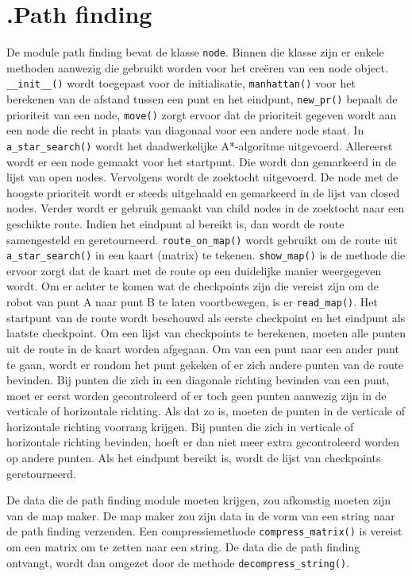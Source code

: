 \documentclass[a4paper,10pt]{article}
\begin{document}
\section*{\label{pathfinding}\thesection.\quad Path finding}
De module path finding bevat de klasse \verb!node!. Binnen die klasse zijn er enkele methoden aanwezig die gebruikt worden voor het cre\"{e}ren van een node object. \verb!__init__()! wordt toegepast voor de initialisatie, \verb!manhattan()! voor het berekenen van de afstand tussen een punt en het eindpunt, \verb!new_pr()! bepaalt de prioriteit van een node, \verb!move()! zorgt ervoor dat de prioriteit gegeven wordt aan een node die recht in plaats van diagonaal voor een andere node staat. In \verb!a_star_search()! wordt het daadwerkelijke A*-algoritme uitgevoerd. Allereerst wordt er een node gemaakt voor het startpunt. Die wordt dan gemarkeerd in de lijst van open nodes. Vervolgens wordt de zoektocht uitgevoerd. De node met de hoogste prioriteit wordt er steeds uitgehaald en gemarkeerd in de lijst van closed nodes. 
Verder wordt er gebruik gemaakt van child nodes in de zoektocht naar een geschikte route. Indien het eindpunt al bereikt is, dan wordt de route samengesteld en geretourneerd. \verb!route_on_map()! wordt gebruikt om de route uit \verb!a_star_search()! in een kaart (matrix) te tekenen. \verb!show_map()! is de methode die ervoor zorgt dat de kaart met de route op een duidelijke manier weergegeven wordt.
Om er achter te komen wat de checkpoints zijn die vereist zijn om de robot van punt A naar punt B te laten voortbewegen, is er \verb!read_map()!. Het startpunt van de route wordt beschouwd als eerste checkpoint en het eindpunt als laatste checkpoint. Om een lijst van checkpoints te berekenen, moeten alle punten uit de route in de kaart worden afgegaan. Om van een punt naar een ander punt te gaan, wordt er rondom het punt gekeken of er zich andere punten van de route bevinden. Bij punten die zich in een diagonale richting bevinden van een punt, moet er eerst worden gecontroleerd of er toch geen punten aanwezig zijn in de verticale of horizontale richting. Als dat zo is, moeten de punten in de verticale of horizontale richting voorrang krijgen. Bij punten die zich in verticale of horizontale richting bevinden, hoeft er dan niet meer extra gecontroleerd worden op andere punten. Als het eindpunt bereikt is, wordt de lijst van checkpoints geretourneerd.

De data die de path finding module moeten krijgen, zou afkomstig moeten zijn van de map maker. De map maker zou zijn data in de vorm van een string naar de path finding verzenden. Een compressiemethode \verb!compress_matrix()! is vereist om een matrix om te zetten naar een string. De data die de path finding ontvangt, wordt dan omgezet door de methode \verb!decompress_string()!.
\end{document}
